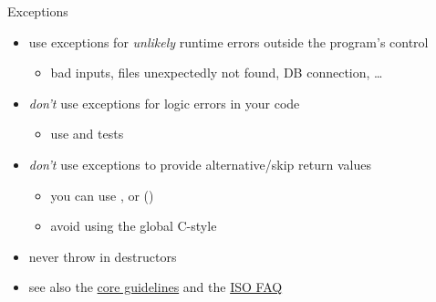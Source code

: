\begin{frame}[fragile]
  \begin{goodpractice}{Exceptions}
    \begin{itemize}
      \item use exceptions for \textit{unlikely} runtime errors outside the program's control
      \begin{itemize}
        \item bad inputs, files unexpectedly not found, DB connection, \ldots
      \end{itemize}
      \item \textit{don't} use exceptions for logic errors in your code
      \begin{itemize}
        \item use  and tests
      \end{itemize}
      \item \textit{don't} use exceptions to provide alternative/skip return values
      \begin{itemize}
        \item you can use ,  or  ()
        \item avoid using the global C-style 
      \end{itemize}
      \item never throw in destructors
      \item see also the \href{https://isocpp.github.io/CppCoreGuidelines/CppCoreGuidelines#S-errors}{\cpp core guidelines} and the \href{https://isocpp.org/wiki/faq/exceptions}{ISO \cpp FAQ}
    \end{itemize}
  \end{goodpractice}
\end{frame}

